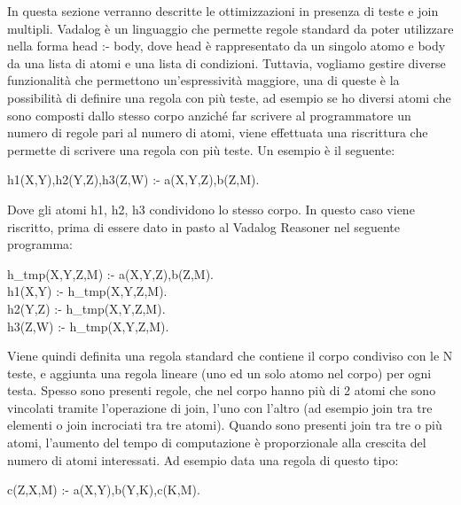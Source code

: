 In questa sezione verranno descritte le ottimizzazioni in presenza di teste e join multipli. \newline
Vadalog è un linguaggio che permette regole standard da poter utilizzare nella forma head :- body, dove head è rappresentato da un singolo atomo e body da una lista di atomi e una lista di condizioni. \newline
Tuttavia, vogliamo gestire diverse funzionalità che permettono un'espressività maggiore, una di queste è la possibilità di definire una regola con più teste, ad esempio se ho diversi atomi che sono composti dallo stesso corpo anziché far scrivere al programmatore un numero di regole pari al numero di atomi, viene effettuata una riscrittura che permette di scrivere una regola con più teste. Un esempio è il seguente: 

\begin{algorithm}
	h1(X,Y),h2(Y,Z),h3(Z,W) :- a(X,Y,Z),b(Z,M).
\end{algorithm}

Dove gli atomi h1, h2, h3 condividono lo stesso corpo. \newline
In questo caso viene riscritto, prima di essere dato in pasto al Vadalog Reasoner nel seguente programma: 

\begin{algorithm}
	h\_tmp(X,Y,Z,M) :- a(X,Y,Z),b(Z,M). \\
	h1(X,Y) :- h\_tmp(X,Y,Z,M). \\
	h2(Y,Z) :- h\_tmp(X,Y,Z,M). \\
	h3(Z,W) :- h\_tmp(X,Y,Z,M). 
\end{algorithm}

Viene quindi definita una regola standard che contiene il corpo condiviso con le N teste, e aggiunta una regola lineare (uno ed un solo atomo nel corpo) per ogni testa. \newline \newline
Spesso sono presenti regole, che nel corpo hanno più di 2 atomi che sono vincolati tramite l'operazione di join, l'uno con l'altro (ad esempio join tra tre elementi o join incrociati tra tre atomi). \newline
Quando sono presenti join tra tre o più atomi, l'aumento del tempo di computazione è proporzionale alla crescita del numero di atomi interessati. Ad esempio data una regola di questo tipo:

\begin{algorithm}
	c(Z,X,M) :- a(X,Y),b(Y,K),c(K,M).
\end{algorithm}

